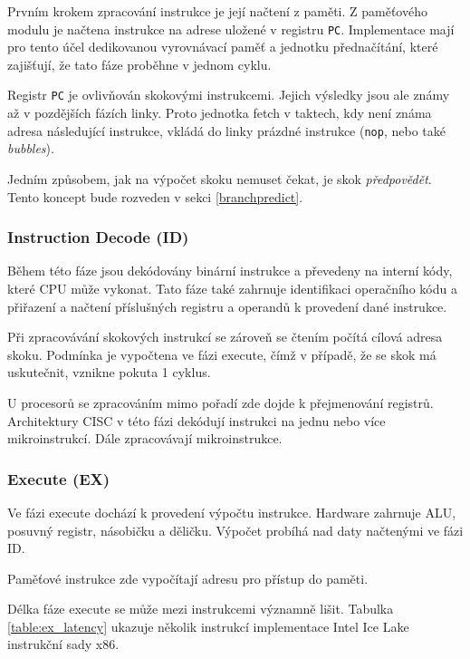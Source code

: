 Prvním krokem zpracování instrukce je její načtení z paměti.
Z paměťového modulu je načtena instrukce na adrese uložené v registru \texttt{PC}.
Implementace mají pro tento účel dedikovanou vyrovnávací paměť a jednotku přednačítání, které zajišťují, že tato fáze proběhne v jednom cyklu.

Registr \texttt{PC} je ovlivňován skokovými instrukcemi.
Jejich výsledky jsou ale známy až v pozdějších fázích linky.
Proto jednotka fetch v taktech, kdy není známa adresa následující instrukce, vkládá do linky prázdné instrukce (\texttt{nop}, nebo také \emph{bubbles}).

Jedním způsobem, jak na výpočet skoku nemuset čekat, je skok \emph{předpovědět}.
Tento koncept bude rozveden v sekci \ref{branchpredict}.

\subsubsection{Instruction Decode (ID)}

Během této fáze jsou dekódovány binární instrukce a převedeny na interní kódy, které CPU může vykonat.
Tato fáze také zahrnuje identifikaci operačního kódu a přiřazení a načtení příslušných registru a operandů k provedení dané instrukce.

Při zpracovávání skokových instrukcí se zároveň se čtením počítá cílová adresa skoku.
Podmínka je vypočtena ve fázi execute, čímž v případě, že se skok má uskutečnit, vznikne pokuta 1 cyklus.

U procesorů se zpracováním mimo pořadí zde dojde k přejmenování registrů.
Architektury CISC v této fázi dekódují instrukci na jednu nebo více mikroinstrukcí.
Dále zpracovávají mikroinstrukce.

\subsubsection{Execute (EX)}

Ve fázi execute dochází k provedení výpočtu instrukce.
Hardware zahrnuje ALU, posuvný registr, násobičku a děličku.
Výpočet probíhá nad daty načtenými ve fázi ID.

Paměťové instrukce zde vypočítají adresu pro přístup do paměti. 

Délka fáze execute se může mezi instrukcemi významně lišit.
Tabulka \ref{table:ex_latency} ukazuje několik instrukcí implementace Intel Ice Lake instrukční sady x86.

